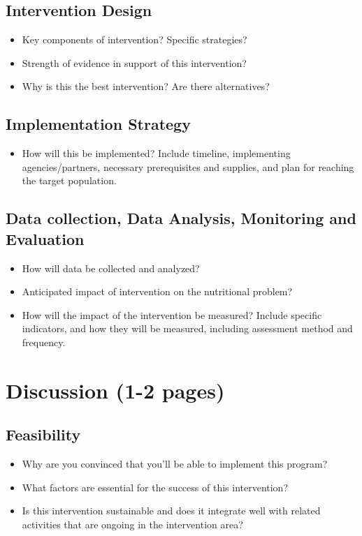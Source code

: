 \documentclass[12pt, letterpaper, draft]{article}
\begin{document}
\subsection{Intervention Design}
\begin{itemize}
    \item Key components of intervention? Specific strategies?
    \item Strength of evidence in support of this intervention?
    \item Why is this the best intervention? Are there alternatives?
\end{itemize}
\subsection{Implementation Strategy}
\begin{itemize}
    \item How will this be implemented? Include timeline, implementing agencies/partners,
    necessary prerequisites and supplies, and plan for reaching the target population.
\end{itemize}
\subsection{Data collection, Data Analysis, Monitoring and Evaluation}
\begin{itemize}
    \item How will data be collected and analyzed?
    \item Anticipated impact of intervention on the nutritional problem?
    \item How will the impact of the intervention be measured? Include specific
    indicators, and how they will be measured, including assessment method and frequency.
\end{itemize}
\section{Discussion (1-2 pages)}
\subsection{Feasibility}
\begin{itemize}
    \item Why are you convinced that you'll be able to implement this program?
    \item What factors are essential for the success of this intervention?
    \item Is this intervention sustainable and does it integrate well
    with related activities that are ongoing in the intervention area?
\end{itemize}
\end{document}
